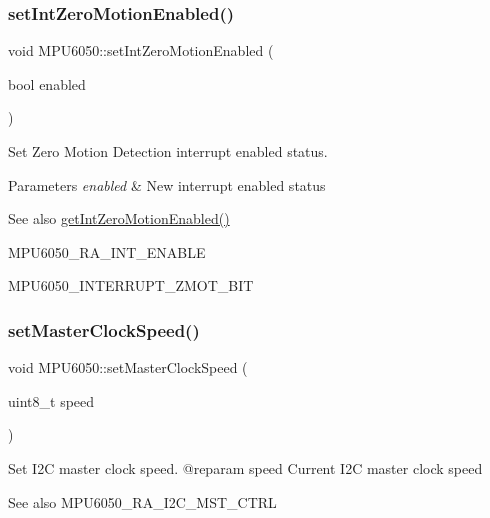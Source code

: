 \subsubsection{\texorpdfstring{setIntZeroMotionEnabled()}{setIntZeroMotionEnabled()}}
{\footnotesize\ttfamily void M\+P\+U6050\+::set\+Int\+Zero\+Motion\+Enabled (\begin{DoxyParamCaption}\item[{bool}]{enabled }\end{DoxyParamCaption})}

Set Zero Motion Detection interrupt enabled status. 
\begin{DoxyParams}{Parameters}
{\em enabled} & New interrupt enabled status \\
\hline
\end{DoxyParams}
\begin{DoxySeeAlso}{See also}
\mbox{\hyperlink{class_m_p_u6050_ab3cc9bcaca6cec61e7f3f0c6c8a37db5}{get\+Int\+Zero\+Motion\+Enabled()}} 

M\+P\+U6050\+\_\+\+R\+A\+\_\+\+I\+N\+T\+\_\+\+E\+N\+A\+B\+LE 

M\+P\+U6050\+\_\+\+I\+N\+T\+E\+R\+R\+U\+P\+T\+\_\+\+Z\+M\+O\+T\+\_\+\+B\+IT 
\end{DoxySeeAlso}
\mbox{\label{class_m_p_u6050_a8a4779ea709ff0633f9798369478400b}} 
\subsubsection{\texorpdfstring{setMasterClockSpeed()}{setMasterClockSpeed()}}
{\footnotesize\ttfamily void M\+P\+U6050\+::set\+Master\+Clock\+Speed (\begin{DoxyParamCaption}\item[{uint8\+\_\+t}]{speed }\end{DoxyParamCaption})}

Set I2C master clock speed. @reparam speed Current I2C master clock speed \begin{DoxySeeAlso}{See also}
M\+P\+U6050\+\_\+\+R\+A\+\_\+\+I2\+C\+\_\+\+M\+S\+T\+\_\+\+C\+T\+RL 
\end{DoxySeeAlso}
\mbox{\label{class_m_p_u6050_a74cc3ea727afa5d4406175085e60d08c}} 

